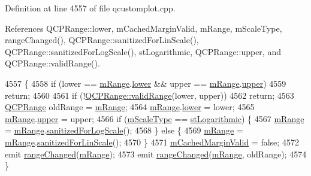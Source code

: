 Definition at line 4557 of file qcustomplot.\+cpp.



References Q\+C\+P\+Range\+::lower, m\+Cached\+Margin\+Valid, m\+Range, m\+Scale\+Type, range\+Changed(), Q\+C\+P\+Range\+::sanitized\+For\+Lin\+Scale(), Q\+C\+P\+Range\+::sanitized\+For\+Log\+Scale(), st\+Logarithmic, Q\+C\+P\+Range\+::upper, and Q\+C\+P\+Range\+::valid\+Range().


\begin{DoxyCode}
4557                                                  \{
4558   \textcolor{keywordflow}{if} (lower == \hyperlink{class_q_c_p_axis_a1ee36773c49062d751560e11f90845f7}{mRange}.\hyperlink{class_q_c_p_range_aa3aca3edb14f7ca0c85d912647b91745}{lower} && upper == \hyperlink{class_q_c_p_axis_a1ee36773c49062d751560e11f90845f7}{mRange}.\hyperlink{class_q_c_p_range_ae44eb3aafe1d0e2ed34b499b6d2e074f}{upper})
4559     \textcolor{keywordflow}{return};
4560 
4561   \textcolor{keywordflow}{if} (!\hyperlink{class_q_c_p_range_ab38bd4841c77c7bb86c9eea0f142dcc0}{QCPRange::validRange}(lower, upper))
4562     \textcolor{keywordflow}{return};
4563   \hyperlink{class_q_c_p_range}{QCPRange} oldRange = \hyperlink{class_q_c_p_axis_a1ee36773c49062d751560e11f90845f7}{mRange};
4564   \hyperlink{class_q_c_p_axis_a1ee36773c49062d751560e11f90845f7}{mRange}.\hyperlink{class_q_c_p_range_aa3aca3edb14f7ca0c85d912647b91745}{lower} = lower;
4565   \hyperlink{class_q_c_p_axis_a1ee36773c49062d751560e11f90845f7}{mRange}.\hyperlink{class_q_c_p_range_ae44eb3aafe1d0e2ed34b499b6d2e074f}{upper} = upper;
4566   \textcolor{keywordflow}{if} (\hyperlink{class_q_c_p_axis_ad706039549cbbbec5fcb2baf7894e04d}{mScaleType} == \hyperlink{class_q_c_p_axis_a36d8e8658dbaa179bf2aeb973db2d6f0abf5b785ad976618816dc6f79b73216d4}{stLogarithmic}) \{
4567     \hyperlink{class_q_c_p_axis_a1ee36773c49062d751560e11f90845f7}{mRange} = \hyperlink{class_q_c_p_axis_a1ee36773c49062d751560e11f90845f7}{mRange}.\hyperlink{class_q_c_p_range_aaf6a9046e78d91eeb8e89584fe46b034}{sanitizedForLogScale}();
4568   \} \textcolor{keywordflow}{else} \{
4569     \hyperlink{class_q_c_p_axis_a1ee36773c49062d751560e11f90845f7}{mRange} = \hyperlink{class_q_c_p_axis_a1ee36773c49062d751560e11f90845f7}{mRange}.\hyperlink{class_q_c_p_range_a1ff029704c29a75adbc1dc36cecaf44c}{sanitizedForLinScale}();
4570   \}
4571   \hyperlink{class_q_c_p_axis_a2cde37b6e385f47e11322df4ac1b0e9b}{mCachedMarginValid} = \textcolor{keyword}{false};
4572   emit \hyperlink{class_q_c_p_axis_a0894084e4c16a1736534c4095746f910}{rangeChanged}(\hyperlink{class_q_c_p_axis_a1ee36773c49062d751560e11f90845f7}{mRange});
4573   emit \hyperlink{class_q_c_p_axis_a0894084e4c16a1736534c4095746f910}{rangeChanged}(\hyperlink{class_q_c_p_axis_a1ee36773c49062d751560e11f90845f7}{mRange}, oldRange);
4574 \}
\end{DoxyCode}


